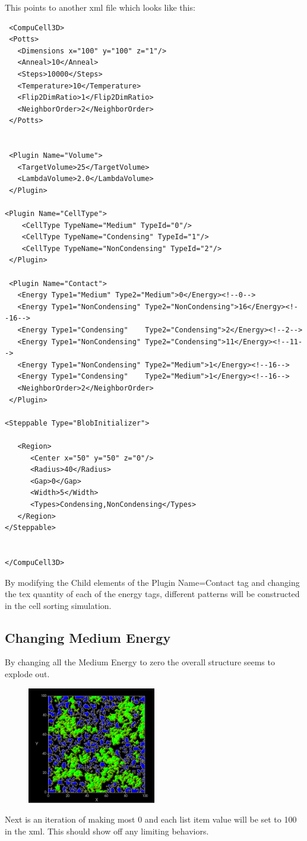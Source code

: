 \documentclass{article}
\begin{document}
This points to another xml file which looks like this:
\lstset{language=XML}
\begin{lstlisting}
 <CompuCell3D>
 <Potts>
   <Dimensions x="100" y="100" z="1"/>
   <Anneal>10</Anneal>
   <Steps>10000</Steps>
   <Temperature>10</Temperature>
   <Flip2DimRatio>1</Flip2DimRatio>
   <NeighborOrder>2</NeighborOrder>
 </Potts>


 <Plugin Name="Volume">
   <TargetVolume>25</TargetVolume>
   <LambdaVolume>2.0</LambdaVolume>
 </Plugin>

<Plugin Name="CellType">
    <CellType TypeName="Medium" TypeId="0"/>
    <CellType TypeName="Condensing" TypeId="1"/>
    <CellType TypeName="NonCondensing" TypeId="2"/>
 </Plugin>

 <Plugin Name="Contact">
   <Energy Type1="Medium" Type2="Medium">0</Energy><!--0-->
   <Energy Type1="NonCondensing" Type2="NonCondensing">16</Energy><!--16-->
   <Energy Type1="Condensing"    Type2="Condensing">2</Energy><!--2-->
   <Energy Type1="NonCondensing" Type2="Condensing">11</Energy><!--11-->
   <Energy Type1="NonCondensing" Type2="Medium">1</Energy><!--16-->
   <Energy Type1="Condensing"    Type2="Medium">1</Energy><!--16-->
   <NeighborOrder>2</NeighborOrder>
 </Plugin>

<Steppable Type="BlobInitializer">
   
   <Region>
      <Center x="50" y="50" z="0"/>
      <Radius>40</Radius>
      <Gap>0</Gap>
      <Width>5</Width>
      <Types>Condensing,NonCondensing</Types>
   </Region>
</Steppable>


</CompuCell3D>

\end{lstlisting}

By modifying the Child elements of the Plugin Name=Contact tag and changing the tex quantity of each of the energy tags, different patterns will be constructed in the cell sorting simulation.

\subsection{Changing Medium Energy}
By changing all the Medium Energy to zero the overall structure seems to explode out.
\begin{figure}[h]
    \includegraphics[width=0.5\textwidth]{changing_medium_0s}
\end{figure}
Next is an iteration of making most 0 and each list item value will be set to 100 in the xml.  This should show off any limiting behaviors.
\end{document}
